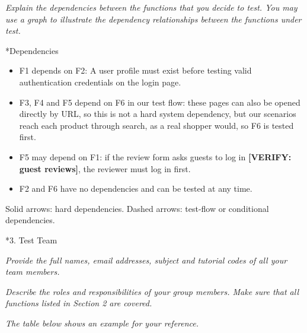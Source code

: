 \documentclass[11pt,a4paper]{article}
\makeatletter
\renewcommand\section{\@startsection{section}{1}{0pt}{3ex plus 1ex}{1.2ex}{\LARGE\bfseries}}
\renewcommand\subsection{\@startsection{subsection}{2}{0pt}{2ex plus .5ex}{.8ex}{\Large\bfseries}}
\newcommand{\instr}[1]{{\color{utsblue}\itshape #1\par}}
\newcommand{\VERIFY}[1]{\textcolor{orange!85!black}{\textbf{[VERIFY: #1]}}}
\makeatother
\begin{document}
\vspace{-1ex}
\instr{Explain the dependencies between the functions that you decide to test. You may use a graph to illustrate the dependency relationships between the functions under test.}

\subsection*{Dependencies}
\begin{itemize}
  \item F1 depends on F2: A user profile must exist before testing valid authentication credentials on the login page.
  \item F3, F4 and F5 depend on F6 in our test flow: these pages can also be opened directly by URL, so this is not a hard system dependency, but our scenarios reach each product through search, as a real shopper would, so F6 is tested first.
  \item F5 may depend on F1: if the review form asks guests to log in \VERIFY{guest reviews}, the reviewer must log in first.
  \item F2 and F6 have no dependencies and can be tested at any time.
\end{itemize}

\begin{center}

{\small Solid arrows: hard dependencies. Dashed arrows: test-flow or conditional dependencies.}
\end{center}

\section*{3. Test Team}
\instr{Provide the full names, email addresses, subject and tutorial codes of all your team members.}
\instr{Describe the roles and responsibilities of your group members. Make sure that all functions listed in Section 2 are covered.}
\instr{The table below shows an example for your reference.}
\end{document}
